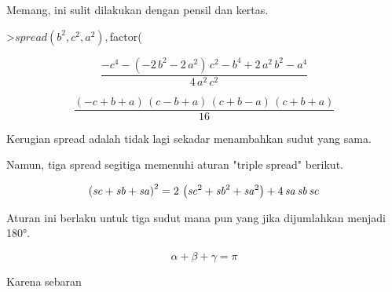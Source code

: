 \documentclass[a4paper,10pt]{article}
\begin{document}
\begin{eulernotebook}
\begin{eulercomment}
\begin{eulercomment}
\begin{eulercomment}
\begin{eulercomment}
\begin{eulercomment}
\begin{eulercomment}
\begin{eulercomment}
\begin{eulercomment}
\begin{eulercomment}
\begin{eulercomment}
\begin{eulercomment}
\begin{eulercomment}
\begin{eulercomment}
\begin{eulercomment}
\begin{eulercomment}
\begin{eulercomment}
\begin{eulercomment}
\begin{eulercomment}
\begin{eulercomment}
\begin{eulercomment}
\begin{eulercomment}
\begin{eulercomment}
\begin{eulercomment}
\begin{eulercomment}
\begin{eulercomment}
\begin{eulercomment}
\begin{eulercomment}
\begin{eulercomment}
\begin{eulercomment}
\begin{eulercomment}
\begin{eulercomment}
\begin{eulercomment}
\begin{eulercomment}
Memang, ini sulit dilakukan dengan pensil dan kertas.
\end{eulercomment}
\begin{eulerprompt}
>$spread(b^2,c^2,a^2), $factor(%
\end{eulerprompt}
\begin{eulerformula}
\[
\frac{-c^4-\left(-2\,b^2-2\,a^2\right)\,c^2-b^4+2\,a^2\,b^2-a^4}{4
 \,a^2\,c^2}
\]
\end{eulerformula}
\begin{eulerformula}
\[
\frac{\left(-c+b+a\right)\,\left(c-b+a\right)\,\left(c+b-a\right)\,
 \left(c+b+a\right)}{16}
\]
\end{eulerformula}
\begin{eulercomment}
Kerugian spread adalah tidak lagi sekadar menambahkan sudut yang sama.

Namun, tiga spread segitiga memenuhi aturan "triple spread" berikut.
\end{eulercomment}
\begin{eulerformula}
\[
\left({\it sc}+{\it sb}+{\it sa}\right)^2=2\,\left({\it sc}^2+
 {\it sb}^2+{\it sa}^2\right)+4\,{\it sa}\,{\it sb}\,{\it sc}
\]
\end{eulerformula}
\begin{eulercomment}
Aturan ini berlaku untuk tiga sudut mana pun yang jika dijumlahkan
menjadi 180°.

\end{eulercomment}
\begin{eulerformula}
\[
\alpha+\beta+\gamma=\pi
\]
\end{eulerformula}
\begin{eulercomment}
Karena sebaran


\end{eulercomment}
\end{eulercomment}
\end{eulercomment}
\end{eulercomment}
\end{eulercomment}
\end{eulercomment}
\end{eulercomment}
\end{eulercomment}
\end{eulercomment}
\end{eulercomment}
\end{eulercomment}
\end{eulercomment}
\end{eulercomment}
\end{eulercomment}
\end{eulercomment}
\end{eulercomment}
\end{eulercomment}
\end{eulercomment}
\end{eulercomment}
\end{eulercomment}
\end{eulercomment}
\end{eulercomment}
\end{eulercomment}
\end{eulercomment}
\end{eulercomment}
\end{eulercomment}
\end{eulercomment}
\end{eulercomment}
\end{eulercomment}
\end{eulercomment}
\end{eulercomment}
\end{eulercomment}
\end{eulercomment}
\end{eulernotebook}
\end{document}
